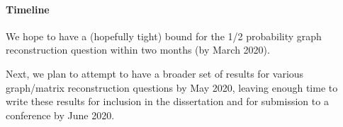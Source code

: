 \paragraph*{Timeline}
We hope to have a (hopefully tight) bound for the 1/2 probability graph reconstruction question within two months (by March 2020).

Next, we plan to attempt to have a broader set of results for various graph/matrix reconstruction questions by May 2020, leaving enough time to write these results for inclusion in the dissertation and for submission to a conference by June 2020.